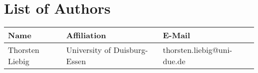 \chapter*{List of Authors}
\begin{tabularx}{\textwidth}{lll}
  \textbf{Name}&\textbf{Affiliation}&\textbf{E-Mail}\\ \hline
  Thorsten Liebig&University of Duisburg-Essen&thorsten.liebig@uni-due.de
\end{tabularx}

